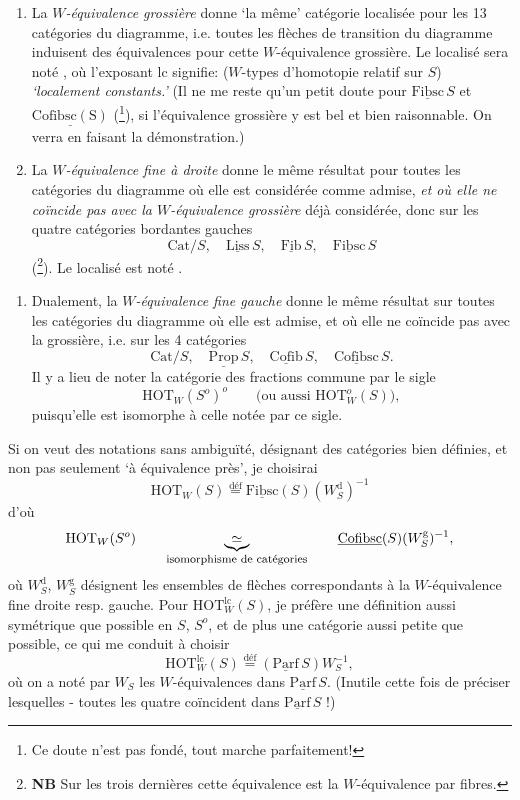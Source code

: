 \documentclass[11pt]{article}
\newcommand{\printedpage}[1]{\marginpar{\footnotesize p.~#1}}
\newcommand{\msp}[1]{\marginpar{\footnotesize [#1]}}
\newcommand{\uc}[1]{\underline{\mathrm{#1}}}
\newcommand{\HOT}{\mathrm{HOT}}
\newcommand{\Cat}{\mathrm{Cat}}
\newcommand{\defeq}{\overset{\text{déf}}{=}}
\begin{document}
\begin{enumerate}[leftmargin=*]
\item[$1^o$)] La \textit{$W$-équivalence grossière} donne `la même' catégorie localisée pour les 13 catégories du diagramme, i.e. toutes les flèches de transition du diagramme induisent des équivalences pour cette $W$-équivalence grossière. Le localisé sera noté \fbox{$\HOT^{\mathrm{lc}}_W(S)$}, où l'exposant lc signifie: ($W$-types d'homotopie relatif sur $S$) \textit{`localement constants.'} (Il ne me reste qu'un petit doute pour $\uc{Fibsc}\,S$ et $\uc{Cofibsc(S)}$ (\footnote[34]{Ce doute n'est pas fondé, tout marche parfaitement!}), si l'équivalence grossière y est bel et bien raisonnable. On verra en faisant la démonstration.)

\item[$2^o$)] La \textit{$W$-équivalence fine à droite} donne le même résultat pour toutes les catégories du diagramme où elle est considérée comme admise, \textit{et où elle ne coïncide pas avec la $W$-équivalence grossière} déjà considérée, donc sur les quatre catégories bordantes gauches
\[
\Cat/S,\quad \uc{Liss}\,S,\quad \uc{Fib}\,S,\quad \uc{Fibsc}\,S
\]
(\footnote[35]{\textbf{NB} Sur les trois dernières cette équivalence est la $W$-équivalence par fibres.}). Le localisé est noté \fbox{$\HOT_W(S)$}.
\end{enumerate}

\msp{page 50}

\printedpage{31}

\begin{enumerate}[leftmargin=*]
\item[$2'^o$)] Dualement, la \textit{$W$-équivalence fine gauche} donne le même résultat sur toutes les catégories du diagramme où elle est admise, et où elle ne coïncide pas avec la grossière, i.e. sur les 4 catégories
\[
\Cat/S,\quad \uc{Prop}\,S,\quad \uc{Cofib}\,S,\quad \uc{Cofibsc}\,S.
\]
Il y a lieu de noter la catégorie des fractions commune par le sigle
\[
\HOT_W(S^o)^o \qquad \text{(ou aussi $\HOT^o_W(S)$)},
\]
puisqu'elle est isomorphe à celle notée par ce sigle.
\end{enumerate}

Si on veut des notations sans ambiguïté, désignant des catégories bien définies, et non pas seulement `à équivalence près', je choisirai
\[
\HOT_W(S) \defeq \uc{Fibsc}(S)(W^{\mathrm{d}}_S)^{-1}
\]
d'où
\[
\HOT_W(S^o) \qquad \underbrace{\simeq}_{\text{\footnotesize isomorphisme de catégories}} \qquad \uc{Cofibsc}(S)(W^{\mathrm{g}}_S)^{-1},
\]
où $W^{\mathrm{d}}_S$, $W^{\mathrm{g}}_S$ désignent les ensembles de flèches correspondants à la $W$-équivalence fine droite resp. gauche. Pour $\HOT^{\mathrm{lc}}_W(S)$, je préfère une définition aussi symétrique que possible en $S$, $S^o$, et de plus une catégorie aussi petite que possible, ce qui me conduit à choisir
\[
\HOT^{\mathrm{lc}}_W(S) \defeq (\uc{Parf}\,S)W^{-1}_S,
\]
où on a noté par $W_S$ les $W$-équivalences dans $\uc{Parf}\,S$. (Inutile cette fois de préciser lesquelles - toutes les quatre coïncident dans $\uc{Parf}\,S$ !)
\end{document}
